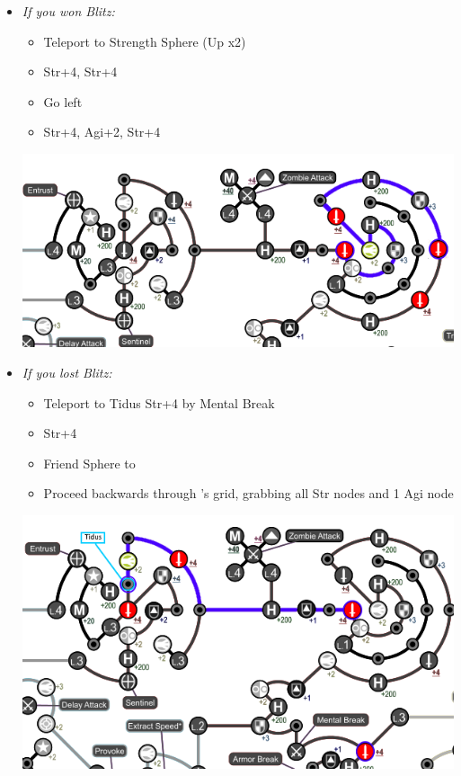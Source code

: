 \begin{spheregrid}
  \begin{itemize}
    \yunaf
    \item \textit{If you won Blitz:}
          \begin{itemize}
            \item Teleport to Strength Sphere (Up x2)
            \item Str+4, Str+4
            \item Go left
            \item Str+4, Agi+2, Str+4
          \end{itemize}
          \includegraphics[width=.9\columnwidth]{graphics/Yuna_blitz_win_highroad}
    \item \textit{If you lost Blitz:}
          \begin{itemize}
            \item Teleport to Tidus Str+4 by Mental Break
            \item Str+4
            \item Friend Sphere to \tidus
            \item Proceed backwards through \auron's grid, grabbing all Str nodes and 1 Agi node
          \end{itemize}
          \includegraphics[width=.9\columnwidth]{graphics/Yuna_blitz_lose_highroad}
  \end{itemize}
\end{spheregrid}
